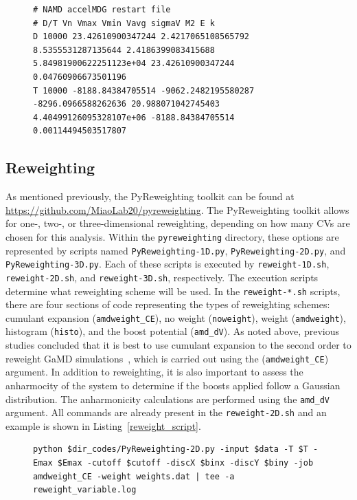 \documentclass[9pt,tutorial]{livecoms}
\begin{document}
\begin{figure}
\begin{lstlisting}[label=energyfile,caption=system.gamd, basicstyle=\small,breaklines=true, backgroundcolor=\color{light-gray}]
# NAMD accelMDG restart file
# D/T Vn Vmax Vmin Vavg sigmaV M2 E k
D 10000 23.42610900347244 2.4217065108565792 8.5355531287135644 2.4186399083415688 5.84981900622251123e+04 23.42610900347244 0.04760906673501196
T 10000 -8188.84384705514 -9062.2482195580287 -8296.0966588262636 20.988071042745403 4.40499126095328107e+06 -8188.84384705514 0.00114494503517807             
\end{lstlisting}
\end{figure}

\subsection{Reweighting}
\label{ss:reweight}
As mentioned previously, the PyReweighting toolkit can be found at \url{https://github.com/MiaoLab20/pyreweighting}. The PyReweighting toolkit allows for one-, two-, or three-dimensional reweighting, depending on how many CVs are chosen for this analysis. Within the \texttt{pyreweighting} directory, these options are represented by scripts named \texttt{PyReweighting-1D.py}, \texttt{PyReweighting-2D.py}, and \texttt{PyReweighting-3D.py}. Each of these scripts is executed by \texttt{reweight-1D.sh}, \texttt{reweight-2D.sh}, and \texttt{reweight-3D.sh}, respectively. The execution scripts determine what reweighting scheme will be used. In the \texttt{reweight-*.sh} scripts, there are four sections of code representing the types of reweighting schemes: cumulant expansion (\texttt{amdweight\_CE}), no weight (\texttt{noweight}), weight (\texttt{amdweight}), histogram (\texttt{histo}), and the boost potential (\texttt{amd\_dV}). As noted above, previous studies concluded that it is best to use cumulant expansion to the second order to reweight GaMD simulations~\cite{shen_statistical_2008, miao_improved_2014}, which is carried out using the (\texttt{amdweight\_CE}) argument. In addition to reweighting, it is also important to assess the anharmocity of the system to determine if the boosts applied follow a Gaussian distribution. The anharmonicity calculations are performed using the \texttt{amd\_dV} argument. All commands are already present in the \texttt{reweight-2D.sh} and an example is shown in Listing~\ref{reweight_script}.

\begin{figure}[hbt]
\begin{lstlisting}[label=reweight_script,caption=reweight-2D.sh, basicstyle=\small,breaklines=true, backgroundcolor=\color{light-gray}]
python $dir_codes/PyReweighting-2D.py -input $data -T $T -Emax $Emax -cutoff $cutoff -discX $binx -discY $biny -job amdweight_CE -weight weights.dat | tee -a reweight_variable.log
\end{lstlisting}
\end{figure}
\end{document}

